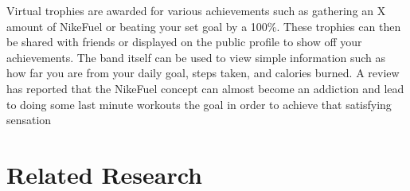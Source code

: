Virtual trophies are awarded for various achievements such as gathering an X amount of NikeFuel or beating your set goal by a 100\%. These trophies can then be shared with friends or displayed on the public profile to show off your achievements. The band itself can be used to view simple information such as how far you are from your daily goal, steps taken, and calories burned. A review has reported that the NikeFuel concept can almost become an addiction and lead to doing some last minute workouts the goal in order to achieve that satisfying sensation \cite{fuelbandDcRain}



\section{Related Research}

